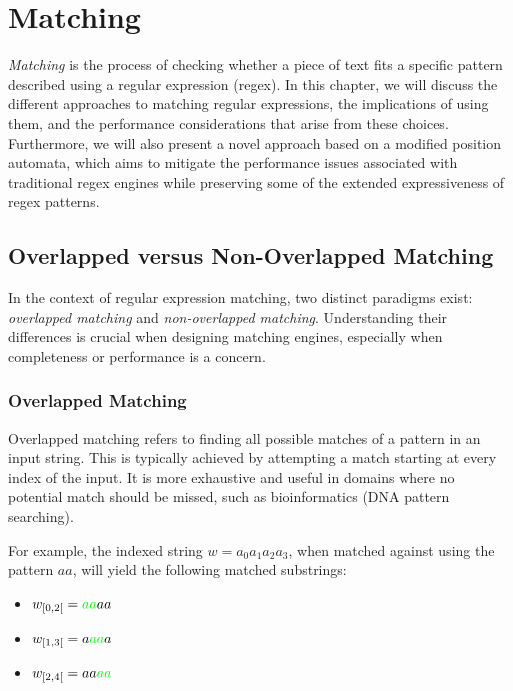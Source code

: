\chapter{Matching}\label{chap:matching}

\emph{Matching} is the process of checking whether a piece of text fits a specific pattern described using a regular expression (regex).
In this chapter, we will discuss the different approaches to matching regular expressions, the implications of using them, and the performance considerations that arise from these choices. Furthermore, we will also present a novel approach based on a modified position automata, which aims to mitigate the performance issues associated with traditional regex engines while preserving some of the extended expressiveness of regex patterns.

\section{Overlapped versus Non-Overlapped Matching}
\label{sec:overlap-vs-nonoverlap}

In the context of regular expression matching, two distinct paradigms exist: \emph{overlapped matching} and \emph{non-overlapped matching}. Understanding their differences is crucial when designing matching engines, especially when completeness or performance is a concern.

\subsection*{Overlapped Matching}
Overlapped matching refers to finding all possible matches of a pattern in an input string. This is typically achieved by attempting a match starting at every index of the input. It is more exhaustive and useful in domains where no potential match should be missed, such as bioinformatics (DNA pattern searching).

For example, the indexed string $w = a_0 a_1 a_2 a_3$, when matched against using the pattern $aa$, will yield the following matched substrings:

\begin{itemize}
	\item $w_{[0,2[} = {\color{green}{aa}}aa$
	\item $w_{[1,3[} = a{\color{green}{aa}}a$
	\item $w_{[2,4[} = aa{\color{green}{aa}}$
\end{itemize}

